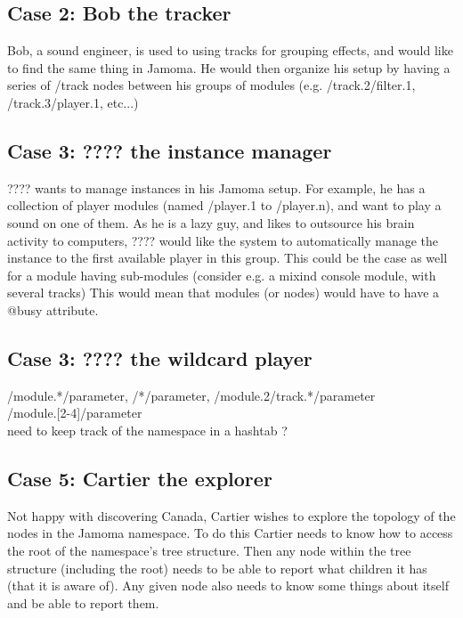 \documentclass[]{article}
\begin{document}
\subsection{Case 2: Bob the tracker}
Bob, a sound engineer, is used to using tracks for grouping effects, and would like to find the same thing in Jamoma. He would then organize his setup by having a series of /track nodes between his groups of modules (e.g. /track.2/filter.1, /track.3/player.1, etc...)

\subsection{Case 3: ???? the instance manager}
???? wants to manage instances in his Jamoma setup. For example, he has a collection of player modules (named /player.1 to /player.n), and want to play a sound on one of them. As he is a lazy guy, and likes to outsource his brain activity to computers, ???? would like the system to automatically manage the instance to the first available player in this group. This could be the case as well for a module having sub-modules (consider e.g. a mixind console module, with several tracks) This would mean that modules (or nodes) would have to have a @busy attribute. 

\subsection{Case 3: ???? the wildcard player}
/module.*/parameter, /*/parameter, /module.2/track.*/parameter\\
/module.[2-4]/parameter\\
need to keep track of the namespace in a hashtab ?

\subsection{Case 5: Cartier the explorer}

Not happy with discovering Canada, Cartier wishes to explore the topology of the nodes in the Jamoma namespace.  To do this Cartier needs to know how to access the root of the namespace's tree structure.  Then any node within the tree structure (including the root) needs to be able to report what children it has (that it is aware of).  Any given node also needs to know some things about itself and be able to report them.


\end{document}

